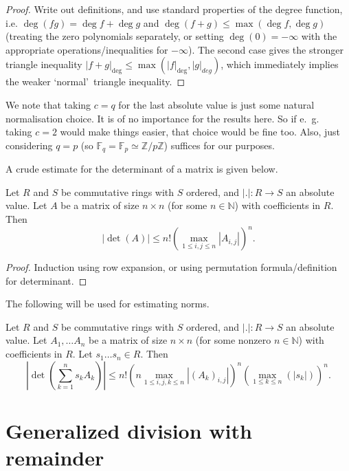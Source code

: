 \documentclass{amsart}
\newcommand{\N}{\mathbb{N}}
\newcommand{\Z}{\mathbb{Z}}
\newcommand{\F}{\mathbb{F}}
\begin{document}
\begin{proof}
Write out definitions, and use standard properties of the degree function, i.e. $\deg (fg)=\deg f+\deg g$ and $\deg(f+g)\leq \max(\deg f,\deg g)$ (treating the zero polynomials separately, or setting $\deg(0)=-\infty$ with the appropriate operations/inequalities for $-\infty$). The second case gives the stronger triangle inequality $|f+g|_{\deg} \leq \max(|f|_{\deg},|g|_{deg})$, which  immediately implies the weaker \lq normal\rq\ triangle inequality.
\end{proof}

We note that taking $c=q$ for the last absolute value is just some natural normalisation choice. It is of no importance for the results here. So if e.~g.~ taking $c=2$ would make things easier, that choice would be fine too. Also, just considering $q=p$ (so $\F_q=\F_p \simeq \Z/p\Z$) suffices for our purposes.

A crude estimate for the determinant of a matrix is given below.
\begin{lemma}
Let $R$ and $S$ be commutative rings with $S$ ordered, and $|.|:R \to S$ an absolute value.
Let $A$ be a matrix of size $n \times n$ (for some $n\in \N$) with coefficients in $R$. Then 
\[|\det(A)|\leq n! \left(\max_{1\leq i,j\leq n} |A_{i,j}|\right)^n.\]
\end{lemma}

\begin{proof}
Induction using row expansion, or using permutation formula/definition for determinant.
\end{proof}

The following will be used for estimating norms.

\begin{corollary}\label{cor estimate norm}
Let $R$ and $S$ be commutative rings with $S$ ordered, and $|.|:R \to S$ an absolute value.
Let $A_1,\ldots A_n$ be a matrix of size $n \times n$ (for some nonzero $n\in \N$) with coefficients in $R$. Let $s_1\ldots s_n \in R$. Then 
\[ \left|\det(\sum_{k=1}^n s_k A_k) \right| \leq n! \left(n \max_{1\leq i,j,k\leq n} |(A_k)_{i,j}|\right)^n \left( \max_{1\leq k\leq n}(|s_k|) \right)^n.\]
\end{corollary}

\section{Generalized division with remainder}
\end{document}
